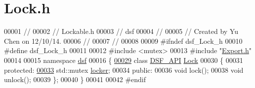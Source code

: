 \hypertarget{_lock_8h_source}{}\section{Lock.\+h}
\label{_lock_8h_source}

\begin{DoxyCode}
00001 \textcolor{comment}{//}
00002 \textcolor{comment}{//  Lockable.h}
00003 \textcolor{comment}{//  dsf}
00004 \textcolor{comment}{//}
00005 \textcolor{comment}{//  Created by Yu Chen on 12/10/14.}
00006 \textcolor{comment}{//}
00007 \textcolor{comment}{//}
00008 
00009 \textcolor{preprocessor}{#ifndef dsf\_Lock\_h}
00010 \textcolor{preprocessor}{#define dsf\_Lock\_h}
00011 
00012 \textcolor{preprocessor}{#include <mutex>}
00013 \textcolor{preprocessor}{#include "\hyperlink{dsf_2_export_8h}{Export.h}"}
00014 
00015 \textcolor{keyword}{namespace }\hyperlink{namespacedsf}{dsf}
00016 \{
\hypertarget{_lock_8h_source_l00029}{}\hyperlink{classdsf_1_1_lock}{00029}     \textcolor{keyword}{class }\hyperlink{dsf_2_export_8h_ad7bb940831423512f29a6981786c37bd}{DSF\_API} \hyperlink{classdsf_1_1_lock}{Lock}
00030     \{
00031     \textcolor{keyword}{protected}:
\hypertarget{_lock_8h_source_l00033}{}\hyperlink{classdsf_1_1_lock_a605f27e33e37dc8b3b920a3272461c44}{00033}         std::mutex \hyperlink{classdsf_1_1_lock_a605f27e33e37dc8b3b920a3272461c44}{locker};
00034     \textcolor{keyword}{public}:
00036         \textcolor{keywordtype}{void} lock();
00038         \textcolor{keywordtype}{void} unlock();
00039     \};
00040 \}
00041 
00042 \textcolor{preprocessor}{#endif}
\end{DoxyCode}
